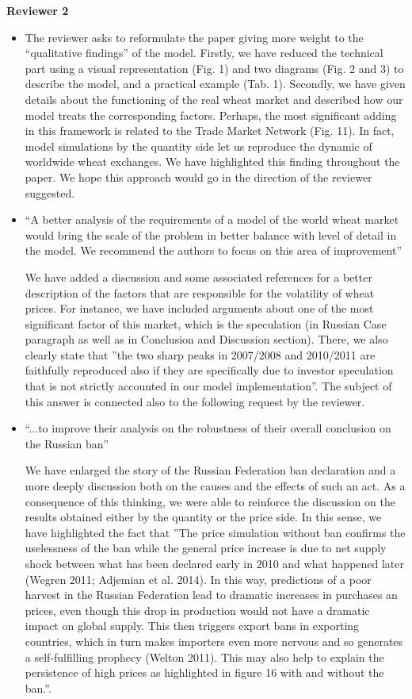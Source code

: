 \documentclass[a4paper,12pt]{article}
\begin{document}
\vskip1cm
\textbf{Reviewer 2}
\begin{itemize}
	\item The reviewer asks to reformulate the paper giving more weight to the ``qualitative findings'' of the model.
    Firstly, we have reduced the technical part using a visual representation (Fig. 1) and two diagrams (Fig. 2 and 3) to describe the model, and a practical example (Tab. 1). Secondly, we have given details about the functioning of the real wheat market and described how our model treats the corresponding factors. Perhaps, the most significant adding in this framework is related to the Trade Market Network (Fig. 11). In fact, model simulations by the quantity side let us reproduce the dynamic of worldwide wheat exchanges. We have highlighted this finding throughout the paper. We hope this approach would go in the direction of the reviewer suggested.
    
    \item ``A better analysis of the requirements of a model of the world wheat market would bring the scale of the problem in better balance with level of detail in the model. We recommend the authors to focus on this area of improvement'' 
    
    We have added a discussion and some associated references for a better description of the factors that are responsible for the volatility of wheat prices. For instance, we have included arguments about one of the most significant factor of this market, which is the speculation (in Russian Case paragraph as well as in Conclusion and Discussion section). There, we also clearly state that ''the two sharp peaks in 2007/2008 and 2010/2011 are faithfully reproduced also if they are specifically due to investor speculation that is not strictly accounted in our model implementation''. The subject of this answer is connected also to the following request by the reviewer.
    
    \item ``...to improve their analysis on the robustness of their overall conclusion on the Russian ban''
    
    We have enlarged the story of the Russian Federation ban declaration and a more deeply discussion both on the causes and the effects of such an act. As a consequence of this thinking, we were able to reinforce the discussion on the results obtained either by the quantity or the price side. In this sense, we have highlighted the fact that  ''The price simulation without ban confirms the uselessness of the ban while the general price increase is due to net supply shock between what has been declared early in 2010 and what happened later (Wegren 2011; Adjemian et al. 2014). In this way, predictions of a poor harvest in the Russian Federation lead to dramatic increases in purchases an prices, even though this drop in production would not have a dramatic impact on global supply. This then triggers export bans in exporting countries, which in turn makes importers even more nervous and so generates a self-fulfilling prophecy (Welton 2011). This may also help to explain the persistence of high prices as highlighted in figure 16 with and without the ban.''. 

	
\end{itemize}
\end{document}
